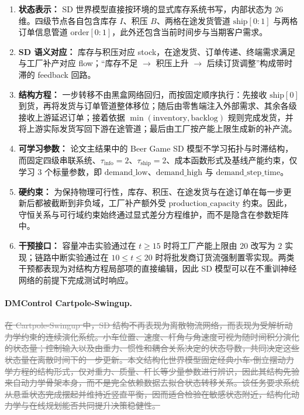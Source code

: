 \documentclass[UTF8]{ctexart}
\let\oldparagraph\paragraph
\renewcommand{\paragraph}[1]{\oldparagraph{#1}\mbox{}}
\newcommand{\revdel}[1]{\textcolor{gray}{\sout{#1}}}
\begin{document}
{\color{red}
\begin{enumerate}
\item \textbf{状态表示：} SD 世界模型直接按环境的显式库存系统书写，内部状态为 \(26\) 维。四级节点各自包含库存 \(I\)、积压 \(B\)、两格在途发货管道 \(\text{ship}[0{:}1]\) 与两格订单信息管道 \(\text{order}[0{:}1]\)，此外还包含当前时间步与当期客户需求。
\item \textbf{SD 语义对应：} 库存与积压对应 stock，在途发货、订单传递、终端需求满足与工厂补产对应 flow；“库存不足 \(\rightarrow\) 积压上升 \(\rightarrow\) 后续订货调整”构成带时滞的 feedback 回路。
\item \textbf{结构方程：} 一步转移不由黑盒网络回归，而按固定顺序执行：先接收 \(\text{ship}[0]\) 到货，再将发货与订单管道整体移位；随后由零售端注入外部需求、其余各级接收上游延迟订单；接着依据 \(\min(\text{inventory},\text{backlog})\) 规则完成发货，并将上游实际发货写回下游在途管道；最后由工厂按产能上限生成新的补产流。
\item \textbf{可学习参数：} 论文主结果中的 Beer Game SD 模型不学习拓扑与时滞结构，而固定四级串联系统、\(\tau_{\text{info}}=2\)、\(\tau_{\text{ship}}=2\)、成本函数形式及基线产能约束，仅学习 \(3\) 个标量参数，即 \(\text{demand\_low}\)、\(\text{demand\_high}\) 与 \(\text{demand\_step\_time}\)。
\item \textbf{硬约束：} 为保持物理可行性，库存、积压、在途发货与在途订单在每一步更新后都被截断到非负域，工厂补产额外受 \(\text{production\_capacity}\) 约束。因此，守恒关系与可行域约束始终通过显式差分方程维护，而不是隐含在参数矩阵中。
\item \textbf{干预接口：} 容量冲击实验通过在 \(t\ge 15\) 时将工厂产能上限由 \(20\) 改写为 \(2\) 实现；链路中断实验通过在 \(10\le t\le 20\) 时将批发商订货流强制置零实现。两类干预都表现为对结构方程局部项的直接编辑，因此 SD 模型可以在不重训神经网络的前提下完成测试时响应。
\end{enumerate}
}

\paragraph{DMControl Cartpole-Swingup.}
\revdel{在 Cartpole-Swingup 中，SD 结构不再表现为离散物流网络，而表现为受解析动力学约束的连续演化系统。小车位置、速度、杆角与角速度可视为随时间积分演化的状态量；控制输入以及由重力、惯性和耦合关系决定的状态导数，共同决定这些状态量在离散时间下的一步更新。本文结构化世界模型固定经典小车-倒立摆动力学方程的结构形式，仅对重力、质量、杆长等少量参数进行辨识，因此其结构先验来自动力学骨架本身，而不是完全依赖数据去拟合状态转移关系。该任务要求系统从悬垂状态完成摆起并维持近竖直平衡，因而适合检验在敏感状态附近，结构化动力学与在线规划能否共同提升决策稳健性。}
\end{document}
